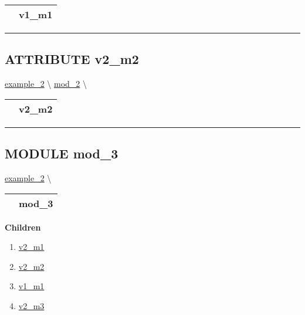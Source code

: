 {\renewcommand{\arraystretch}{1.5}
\begin{tabularx}{\textwidth}{|>{\raggedright\arraybackslash}l|X|}
\hline
\hspace{0pt}\mytexttt{\color{red} } & \textbf{v1\_m1} \\
\hline
\end{tabularx}
}

\par


\rule{\linewidth}{0.5pt}
\subsection*{\textsf{\colorbox{headtoc}{\color{white} ATTRIBUTE}
v2\_m2}}

\hypertarget{ecldoc:example_2.mod_2.v2_m2}{}
\hspace{0pt} \hyperlink{ecldoc:example_2}{example_2} \textbackslash 
\hspace{0pt} \hyperlink{ecldoc:example_2.mod_2}{mod_2} \textbackslash 

{\renewcommand{\arraystretch}{1.5}
\begin{tabularx}{\textwidth}{|>{\raggedright\arraybackslash}l|X|}
\hline
\hspace{0pt}\mytexttt{\color{red} } & \textbf{v2\_m2} \\
\hline
\end{tabularx}
}

\par


\rule{\linewidth}{0.5pt}


\subsection*{\textsf{\colorbox{headtoc}{\color{white} MODULE}
mod\_3}}

\hypertarget{ecldoc:example_2.mod_3}{}
\hspace{0pt} \hyperlink{ecldoc:example_2}{example_2} \textbackslash 

{\renewcommand{\arraystretch}{1.5}
\begin{tabularx}{\textwidth}{|>{\raggedright\arraybackslash}l|X|}
\hline
\hspace{0pt}\mytexttt{\color{red} } & \textbf{mod\_3} \\
\hline
\end{tabularx}
}

\par


\textbf{Children}
\begin{enumerate}
\item \hyperlink{ecldoc:example_2.mod_1.v2_m1}{v2\_m1}
\item \hyperlink{ecldoc:example_2.mod_2.v2_m2}{v2\_m2}
\item \hyperlink{ecldoc:example_2.mod_3.v1_m1}{v1\_m1}
\item \hyperlink{ecldoc:example_2.mod_3.v2_m3}{v2\_m3}
\end{enumerate}

